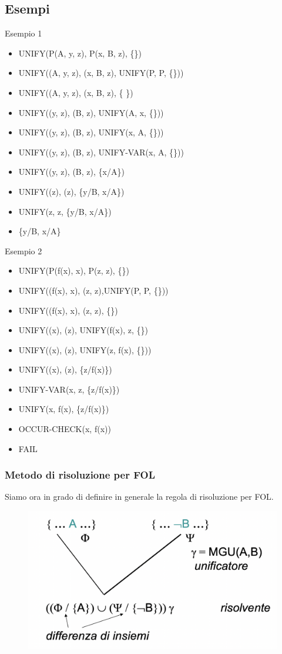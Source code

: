 \documentclass{article}
\begin{document}
\subsection{Esempi}
Esempio 1
\begin{itemize}
    \item UNIFY(P(A, y, z), P(x, B, z), \{\})
    \item UNIFY((A, y, z), (x, B, z), UNIFY(P, P, \{\}))
    \item UNIFY((A, y, z), (x, B, z), \{ \})
    \item UNIFY((y, z), (B, z), UNIFY(A, x, \{\}))
    \item UNIFY((y, z), (B, z), UNIFY(x, A, \{\}))
    \item UNIFY((y, z), (B, z), UNIFY-VAR(x, A, \{\}))
    \item UNIFY((y, z), (B, z), \{x/A\})
    \item UNIFY((z), (z), \{y/B, x/A\})
    \item UNIFY(z, z, \{y/B, x/A\})
    \item \{y/B, x/A\}	
\end{itemize}
Esempio 2
\begin{itemize}
    \item UNIFY(P(f(x), x), P(z, z), \{\})
    \item UNIFY((f(x), x), (z, z),UNIFY(P, P, \{\}))
    \item UNIFY((f(x), x), (z, z), \{\})
    \item UNIFY((x), (z), UNIFY(f(x), z, \{\})
    \item UNIFY((x), (z), UNIFY(z, f(x), \{\}))
    \item UNIFY((x), (z), \{z/f(x)\})
    \item UNIFY-VAR(x, z, \{z/f(x)\})
    \item UNIFY(x, f(x), \{z/f(x)\})
    \item OCCUR-CHECK(x, f(x))
    \item FAIL
\end{itemize}
\subsubsection{Metodo di risoluzione per FOL}
Siamo ora in grado di definire in generale la regola di risoluzione per FOL. \newline
\begin{figure}[h!]
\centering
\includegraphics[scale=0.3]{Images/FOLresolmethod.png}
\end{figure}
\end{document}
